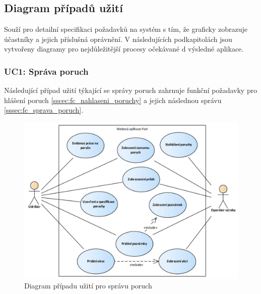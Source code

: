 \documentclass[thesis=M,czech]{FITthesis}[2012/06/26]
\begin{document}
\subsection{Diagram případů užití}
Souží pro detailní specifikaci požadavků na systém s tím, že graficky zobrazuje účastníky a jejich příslušná oprávnění. V následujících podkapitolách jsou vytvořeny diagramy pro nejdůležitější procesy očekávané d výsledné aplikace.
\label{ssec:diagram_pripadu_uziti}
\subsubsection{UC1: Správa poruch}
\label{sssec:uc_sprava_poruch}
Následující případ užití týkající se správy poruch zahrnuje funkční požadavky pro hlášení poruch \ref{sscec:fc_nahlaseni_poruchy} a jejich následnou správu \ref{sssec:fc_sprava_poruch}.
\begin{figure}[H]
	\centering
	\includegraphics[width=1\textwidth]{images/ea_sprava_poruch.jpg}
	\caption{Diagram případu užití pro správu poruch}
	\label{img:uc_sprava_poruch}
\end{figure}
\end{document}

